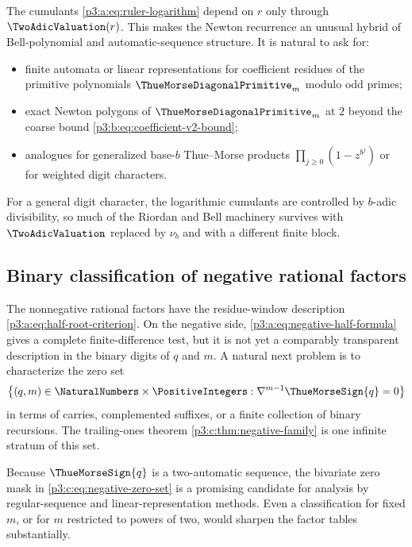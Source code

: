 \documentclass[11pt,oneside]{article}
\numberwithin{equation}{section}
\theoremstyle{definition}
\theoremstyle{remark}
\begin{document}
The cumulants \eqref{p3:a:eq:ruler-logarithm} depend on $r$ only through $\TwoAdicValuation(r)$.  This
makes the Newton recurrence an unusual hybrid of Bell-polynomial and
automatic-sequence structure.  It is natural to ask for:
\begin{itemize}
 \item finite automata or linear representations for coefficient residues of
       the primitive polynomials $\ThueMorseDiagonalPrimitive_m$ modulo odd primes;
 \item exact Newton polygons of $\ThueMorseDiagonalPrimitive_m$ at $2$ beyond the coarse bound
       \eqref{p3:b:eq:coefficient-v2-bound};
 \item analogues for generalized base-$b$ Thue--Morse products
       $\prod_{j\ge0}(1-z^{b^j})$ or for weighted digit characters.
\end{itemize}
For a general digit character, the logarithmic cumulants are controlled by
$b$-adic divisibility, so much of the Riordan and Bell machinery survives
with $\TwoAdicValuation$ replaced by $\nu_b$ and with a different finite block.
\subsection{Binary classification of negative rational factors}

The nonnegative rational factors have the residue-window description
\cref{p3:a:eq:half-root-criterion}.  On the negative side,
\cref{p3:a:eq:negative-half-formula} gives a complete finite-difference test, but it
is not yet a comparably transparent description in the binary digits of
\(q\) and \(m\).  A natural next problem is to characterize the zero set
\begin{equation}
 \left\{(q,m)\in\NaturalNumbers\times\PositiveIntegers:
   \nabla^{m-1}\ThueMorseSign{q}=0\right\}                           \label{p3:c:eq:negative-zero-set}
\end{equation}
in terms of carries, complemented suffixes, or a finite collection of
binary recursions.  The trailing-ones theorem
\cref{p3:c:thm:negative-family} is one infinite stratum of this set.

Because \(\ThueMorseSign{q}\) is a two-automatic sequence, the bivariate zero mask in
\cref{p3:c:eq:negative-zero-set} is a promising candidate for analysis by
regular-sequence and linear-representation methods.  Even a classification
for fixed \(m\), or for \(m\) restricted to powers of two, would sharpen
the factor tables substantially.
\end{document}
